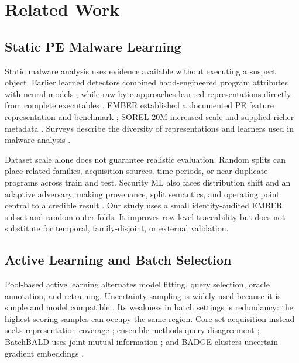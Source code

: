 \section{Related Work}
\label{sec:related}

\subsection{Static PE Malware Learning}

Static malware analysis uses evidence available without executing a suspect
object. Earlier learned detectors combined hand-engineered program attributes
with neural models \cite{saxe2015deep}, while raw-byte approaches learned
representations directly from complete executables \cite{raff2018malware}.
EMBER established a documented PE feature representation and benchmark
\cite{anderson2018ember}; SOREL-20M increased scale and supplied richer metadata
\cite{harang2020sorel}. Surveys describe the diversity of representations and
learners used in malware analysis \cite{ucci2019survey,gibert2020rise}.

Dataset scale alone does not guarantee realistic evaluation. Random splits can
place related families, acquisition sources, time periods, or near-duplicate
programs across train and test. Security ML also faces distribution shift and an
adaptive adversary, making provenance, split semantics, and operating point
central to a credible result \cite{arp2022dos}. Our study uses a small
identity-audited EMBER subset and random outer folds. It improves row-level
traceability but does not substitute for temporal, family-disjoint, or external
validation.

\subsection{Active Learning and Batch Selection}

Pool-based active learning alternates model fitting, query selection, oracle
annotation, and retraining. Uncertainty sampling is widely used because it is
simple and model compatible \cite{cohn1996active,settles2009active}. Its weakness
in batch settings is redundancy: the highest-scoring samples can occupy the same
region. Core-set acquisition instead seeks representation coverage
\cite{sener2018active}; ensemble methods query disagreement
\cite{beluch2018power}; BatchBALD uses joint mutual information
\cite{kirsch2019batchbald}; and BADGE clusters uncertain gradient embeddings
\cite{ash2020deep}.

